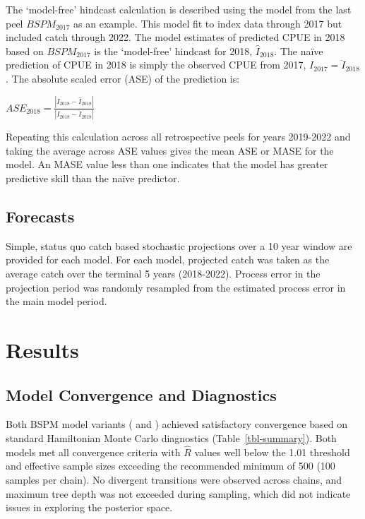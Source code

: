 \documentclass[
  11pt,
]{SCreport}
\begin{document}
The `model-free' hindcast calculation is described using the model from
the last peel \(BSPM_{2017}\) as an example. This model fit to index
data through 2017 but included catch through 2022. The model estimates
of predicted CPUE in 2018 based on \(BSPM_{2017}\) is the `model-free'
hindcast for 2018, \(\hat{I}_{2018}\). The naïve prediction of CPUE in
2018 is simply the observed CPUE from 2017,
\(I_{2017} = \ddot{I}_{2018}\). The absolute scaled error (ASE) of the
prediction is:

\(ASE_{2018} = \frac{|I_{2018} - \hat{I}_{2018}|}{|I_{2018} - \ddot{I}_{2018}|}\)

Repeating this calculation across all retrospective peels for years
2019-2022 and taking the average across ASE values gives the mean ASE or
MASE for the model. An MASE value less than one indicates that the model
has greater predictive skill than the naïve predictor.

\subsection{Forecasts}\label{forecasts}

Simple, status quo catch based stochastic projections over a 10 year
window are provided for each model. For each model, projected catch was
taken as the average catch over the terminal 5 years (2018-2022).
Process error in the projection period was randomly resampled from the
estimated process error in the main model period.

\section{Results}\label{sec-results}

\subsection{Model Convergence and
Diagnostics}\label{sec-model-convergence}

Both BSPM model variants ( and
) achieved satisfactory convergence
based on standard Hamiltonian Monte Carlo diagnostics
(Table~\ref{tbl-summary}). Both models met all convergence criteria with
\(\hat{R}\) values well below the 1.01 threshold and effective sample
sizes exceeding the recommended minimum of 500 (100 samples per chain).
No divergent transitions were observed across chains, and maximum tree
depth was not exceeded during sampling, which did not indicate issues in
exploring the posterior space.
\end{document}
